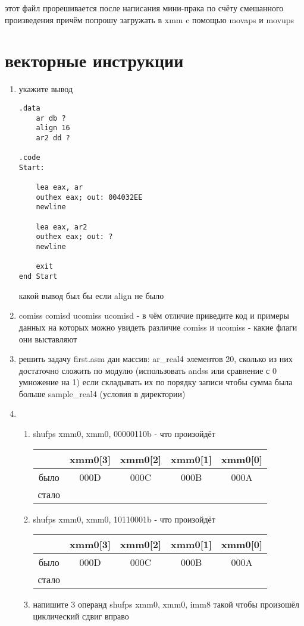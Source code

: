 \documentclass[a4paper,10pt]{article}
\begin{document}
этот файл прорешивается после написания мини-прака по счёту смешанного произведения причём попрошу загружать в xmm c помощью movaps и movups
\section*{векторные инструкции}
\begin{enumerate}
    \item укажите вывод
\begin{verbatim}
.data
    ar db ?
    align 16
    ar2 dd ?

.code
Start:
    
    lea eax, ar
    outhex eax; out: 004032EE
    newline

    lea eax, ar2 
    outhex eax; out: ?
    newline

    exit
end Start
\end{verbatim}
какой вывод был бы если align не было
    \item comiss comisd ucomiss ucomisd - в чём отличие приведите код и примеры данных на которых можно увидеть различие comiss и ucomiss - какие флаги они выставляют
    \item решить задачу first.asm дан массив: ar\_real4 элементов 20, сколько из них достаточно сложить по модулю (использовать andss или сравнение с 0 умножение на 1) если складывать их по порядку записи чтобы сумма была больше sample\_real4 (условия в директории)
    \item 
    \begin{enumerate}
        \item shufps xmm0, xmm0, 00000110b - что произойдёт \\
        \begin{tabular}{|c|c|c|c|c|}
            \hline
             & xmm0[3] & xmm0[2] & xmm0[1] & xmm0[0] \\
             \hline
            было &  000D & 000C & 000B & 000A \\
            \hline
            стало &   &  &  &   \\
            \hline
        \end{tabular}
        \item shufps xmm0, xmm0, 10110001b - что произойдёт \\
        \begin{tabular}{|c|c|c|c|c|}
            \hline
             & xmm0[3] & xmm0[2] & xmm0[1] & xmm0[0] \\
             \hline
            было &  000D & 000C & 000B & 000A \\
            \hline
            стало &   &  &  &   \\
            \hline
        \end{tabular}
        \item напишите 3 операнд shufps xmm0, xmm0, imm8 такой чтобы произошёл циклический сдвиг вправо
    \end{enumerate}


\end{enumerate}
\end{document}
